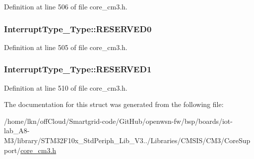 Definition at line 506 of file core\+\_\+cm3.\+h.

\subsubsection[{\texorpdfstring{R\+E\+S\+E\+R\+V\+E\+D0}{RESERVED0}}]{ Interrupt\+Type\+\_\+\+Type\+::\+R\+E\+S\+E\+R\+V\+E\+D0}\hypertarget{struct_interrupt_type___type_ae0d588643b0488fce4c0a90b85edf362}{}\label{struct_interrupt_type___type_ae0d588643b0488fce4c0a90b85edf362}


Definition at line 505 of file core\+\_\+cm3.\+h.

\subsubsection[{\texorpdfstring{R\+E\+S\+E\+R\+V\+E\+D1}{RESERVED1}}]{ Interrupt\+Type\+\_\+\+Type\+::\+R\+E\+S\+E\+R\+V\+E\+D1}\hypertarget{struct_interrupt_type___type_a45933eb981309d50f943ec3af67f17be}{}\label{struct_interrupt_type___type_a45933eb981309d50f943ec3af67f17be}


Definition at line 510 of file core\+\_\+cm3.\+h.



The documentation for this struct was generated from the following file\+:\begin{DoxyCompactItemize}
\item 
/home/lkn/off\+Cloud/\+Smartgrid-\/code/\+Git\+Hub/openwsn-\/fw/bsp/boards/iot-\/lab\+\_\+\+A8-\/\+M3/library/\+S\+T\+M32\+F10x\+\_\+\+Std\+Periph\+\_\+\+Lib\+\_\+\+V3../\+Libraries/\+C\+M\+S\+I\+S/\+C\+M3/\+Core\+Support/\hyperlink{iot-lab___a8-_m3_2library_2_s_t_m32_f10x___std_periph___lib___v3_85_80_2_libraries_2_c_m_s_i_s_241d01c0ea18c1090ebeb06e5ef0ea5eb}{core\+\_\+cm3.\+h}\end{DoxyCompactItemize}
